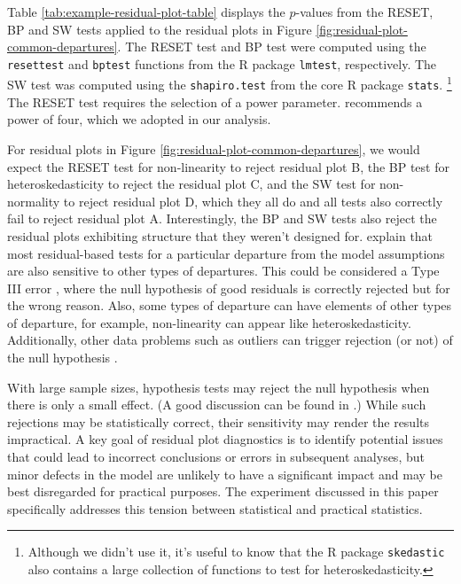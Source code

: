 \documentclass[]{interact}
\theoremstyle{plain}%
\theoremstyle{definition}
\theoremstyle{remark}
\begin{document}
Table \ref{tab:example-residual-plot-table} displays the \(p\)-values
from the RESET, BP and SW tests applied to the residual plots in Figure
\ref{fig:residual-plot-common-departures}. The RESET test and BP test
were computed using the \texttt{resettest} and \texttt{bptest} functions
from the R package \texttt{lmtest}, respectively. The SW test was
computed using the \texttt{shapiro.test} from the core R package
\texttt{stats}. \footnote{Although we didn't use it, it's useful to know
  that the R package \texttt{skedastic} \citep{skedastic} also contains
  a large collection of functions to test for heteroskedasticity.} The
RESET test requires the selection of a power parameter.
\citet{ramsey1969tests} recommends a power of four, which we adopted in
our analysis.

For residual plots in Figure \ref{fig:residual-plot-common-departures},
we would expect the RESET test for non-linearity to reject residual plot
B, the BP test for heteroskedasticity to reject the residual plot C, and
the SW test for non-normality to reject residual plot D, which they all
do and all tests also correctly fail to reject residual plot A.
Interestingly, the BP and SW tests also reject the residual plots
exhibiting structure that they weren't designed for.
\citet{cook1982residuals} explain that most residual-based tests for a
particular departure from the model assumptions are also sensitive to
other types of departures. This could be considered a Type III error
\citep{kimball1957errors}, where the null hypothesis of good residuals
is correctly rejected but for the wrong reason. Also, some types of
departure can have elements of other types of departure, for example,
non-linearity can appear like heteroskedasticity. Additionally, other
data problems such as outliers can trigger rejection (or not) of the
null hypothesis \citep{cook1999applied}.

With large sample sizes, hypothesis tests may reject the null hypothesis
when there is only a small effect. (A good discussion can be found in
\citet{kirk1996practical}.) While such rejections may be statistically
correct, their sensitivity may render the results impractical. A key
goal of residual plot diagnostics is to identify potential issues that
could lead to incorrect conclusions or errors in subsequent analyses,
but minor defects in the model are unlikely to have a significant impact
and may be best disregarded for practical purposes. The experiment
discussed in this paper specifically addresses this tension between
statistical and practical statistics.
\end{document}
